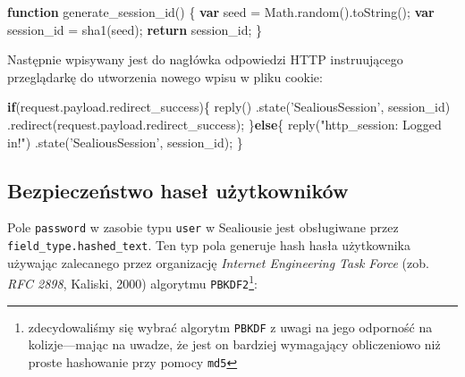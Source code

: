 \documentclass[12pt,polish,a4paper,]{report}
\newenvironment{Shaded}{}{}
\newcommand{\KeywordTok}[1]{\textcolor[rgb]{0.00,0.44,0.13}{\textbf{{#1}}}}
\newcommand{\StringTok}[1]{\textcolor[rgb]{0.25,0.44,0.63}{{#1}}}
\newcommand{\VariableTok}[1]{\textcolor[rgb]{0.10,0.09,0.49}{{#1}}}
\newcommand{\ControlFlowTok}[1]{\textcolor[rgb]{0.00,0.44,0.13}{\textbf{{#1}}}}
\newcommand{\OperatorTok}[1]{\textcolor[rgb]{0.40,0.40,0.40}{{#1}}}
\newcommand{\AttributeTok}[1]{\textcolor[rgb]{0.49,0.56,0.16}{{#1}}}
\newcommand{\NormalTok}[1]{{#1}}
\begin{document}
\begin{Shaded}
\begin{Highlighting}[]
\KeywordTok{function} \AttributeTok{generate_session_id}\NormalTok{() }\OperatorTok{\{}
    \KeywordTok{var} \NormalTok{seed }\OperatorTok{=} \VariableTok{Math}\NormalTok{.}\AttributeTok{random}\NormalTok{().}\AttributeTok{toString}\NormalTok{()}\OperatorTok{;}
    \KeywordTok{var} \NormalTok{session_id }\OperatorTok{=} \AttributeTok{sha1}\NormalTok{(seed)}\OperatorTok{;}
    \ControlFlowTok{return} \NormalTok{session_id}\OperatorTok{;}
\OperatorTok{\}}
\end{Highlighting}
\end{Shaded}

Następnie wpisywany jest do nagłówka odpowiedzi HTTP instruującego
przeglądarkę do utworzenia nowego wpisu w pliku cookie:

\begin{Shaded}
\begin{Highlighting}[]
\ControlFlowTok{if}\NormalTok{(}\VariableTok{request}\NormalTok{.}\VariableTok{payload}\NormalTok{.}\AttributeTok{redirect_success}\NormalTok{)}\OperatorTok{\{}
    \AttributeTok{reply}\NormalTok{()}
        \NormalTok{.}\AttributeTok{state}\NormalTok{(}\StringTok{'SealiousSession'}\OperatorTok{,} \NormalTok{session_id)}
        \NormalTok{.}\AttributeTok{redirect}\NormalTok{(}\VariableTok{request}\NormalTok{.}\VariableTok{payload}\NormalTok{.}\AttributeTok{redirect_success}\NormalTok{)}\OperatorTok{;}
\OperatorTok{\}}\ControlFlowTok{else}\OperatorTok{\{}
    \AttributeTok{reply}\NormalTok{(}\StringTok{"http_session: Logged in!"}\NormalTok{)}
        \NormalTok{.}\AttributeTok{state}\NormalTok{(}\StringTok{'SealiousSession'}\OperatorTok{,} \NormalTok{session_id)}\OperatorTok{;}
\OperatorTok{\}}
\end{Highlighting}
\end{Shaded}

\subsection{Bezpieczeństwo haseł
użytkowników}\label{bezpieczeux144stwo-haseux142-uux17cytkownikuxf3w}

Pole \texttt{password} w zasobie typu \texttt{user} w Sealiousie jest
obsługiwane przez \texttt{field\_type.hashed\_text}. Ten typ pola
generuje hash hasła użytkownika używając zalecanego przez organizację
\emph{Internet Engineering Task Force} (zob. \emph{RFC 2898}, Kaliski,
2000) algorytmu \texttt{PBKDF2}\footnote{zdecydowaliśmy się wybrać
  algorytm \texttt{PBKDF} z uwagi na jego odporność na kolizje---mając
  na uwadze, że jest on bardziej wymagający obliczeniowo niż proste
  hashowanie przy pomocy \texttt{md5}}:
\end{document}
